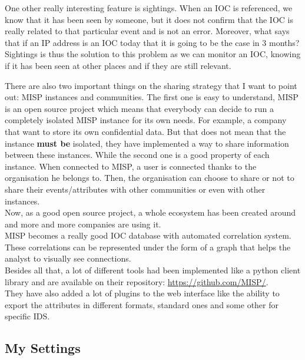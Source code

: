\documentclass{eplmastersthesis}
\begin{document}
One other really interesting feature is sightings. When an IOC is referenced, we know that it has been seen by someone, but it does not confirm that the IOC is really related to that particular event and is not an error. Moreover, what says that if an IP address is an IOC today that it is going to be the case in 3 months? \\
Sightings is thus the solution to this problem as we can monitor an IOC, knowing if it has been seen at other places and if they are still relevant.


There are also two important things on the sharing strategy that I want to point out: MISP instances and communities. The first one is easy to understand, MISP is an open source project which means that everybody can decide to run a completely isolated MISP instance for its own needs. For example, a company that want to store its own confidential data. But that does not mean that the instance \textbf{must be} isolated, they have implemented a way to share information between these instances. While the second one is a good property of each instance. When connected to MISP, a user is connected thanks to the organisation he belongs to. Then, the organisation can choose to share or not to share their events/attributes with other communities or even with other instances. \\ 

Now, as a good open source project, a whole ecosystem has been created around and more and more companies are using it.\\
MISP becomes a really good IOC database with automated correlation system. These correlations can be represented under the form of a graph that helps the analyst to visually see connections.\\
Besides all that, a lot of different tools had been implemented like a python client library and are available on their repository: \url{https://github.com/MISP/}.\\
They have also added a lot of plugins to the web interface like the ability to export the attributes in different formats, standard ones and some other for specific IDS.\\

\subsection{My Settings}
\end{document}
